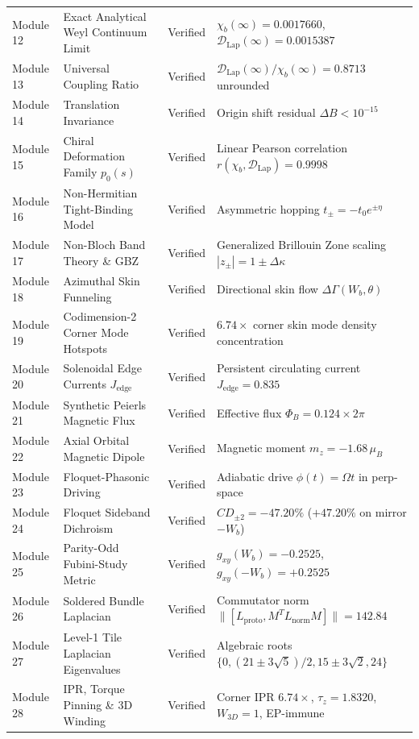 \documentclass[11pt,a4paper]{article}
\theoremstyle{definition}
\begin{document}
\begin{longtable}{p{1.8cm}p{4.2cm}cp{6.2cm}}
Module 12 & Exact Analytical Weyl Continuum Limit & Verified & $\chi_b(\infty) = 0.0017660$, $\mathcal{D}_{\mathrm{Lap}}(\infty) = 0.0015387$ \\
Module 13 & Universal Coupling Ratio & Verified & $\mathcal{D}_{\mathrm{Lap}}(\infty)/\chi_b(\infty) = 0.8713$ unrounded \\
Module 14 & Translation Invariance & Verified & Origin shift residual $\Delta B < 10^{-15}$ \\
Module 15 & Chiral Deformation Family $p_0(s)$ & Verified & Linear Pearson correlation $r(\chi_b, \mathcal{D}_{\mathrm{Lap}}) = 0.9998$ \\
Module 16 & Non-Hermitian Tight-Binding Model & Verified & Asymmetric hopping $t_\pm = -t_0 e^{\pm \eta}$ \\
Module 17 & Non-Bloch Band Theory \& GBZ & Verified & Generalized Brillouin Zone scaling $|z_\pm| = 1 \pm \Delta\kappa$ \\
Module 18 & Azimuthal Skin Funneling & Verified & Directional skin flow $\Delta\Gamma(W_b, \theta)$ \\
Module 19 & Codimension-2 Corner Mode Hotspots & Verified & $6.74\times$ corner skin mode density concentration \\
Module 20 & Solenoidal Edge Currents $J_{\mathrm{edge}}$ & Verified & Persistent circulating current $J_{\mathrm{edge}} = 0.835$ \\
Module 21 & Synthetic Peierls Magnetic Flux & Verified & Effective flux $\Phi_B = 0.124 \times 2\pi$ \\
Module 22 & Axial Orbital Magnetic Dipole & Verified & Magnetic moment $m_z = -1.68 \, \mu_B$ \\
Module 23 & Floquet-Phasonic Driving & Verified & Adiabatic drive $\phi(t) = \Omega t$ in perp-space \\
Module 24 & Floquet Sideband Dichroism & Verified & $CD_{\pm 2} = -47.20\%$ ($+47.20\%$ on mirror $-W_b$) \\
Module 25 & Parity-Odd Fubini-Study Metric & Verified & $g_{xy}(W_b) = -0.2525$, $g_{xy}(-W_b) = +0.2525$ \\
Module 26 & Soldered Bundle Laplacian & Verified & Commutator norm $\|[L_{\mathrm{proto}}, M^T L_{\mathrm{norm}} M]\| = 142.84$ \\
Module 27 & Level-1 Tile Laplacian Eigenvalues & Verified & Algebraic roots $\{0, (21\pm 3\sqrt{5})/2, 15\pm 3\sqrt{2}, 24\}$ \\
Module 28 & IPR, Torque Pinning \& 3D Winding & Verified & Corner IPR $6.74\times$, $\tau_z = 1.8320$, $W_{3D} = 1$, EP-immune \\

\end{longtable}
\end{document}
